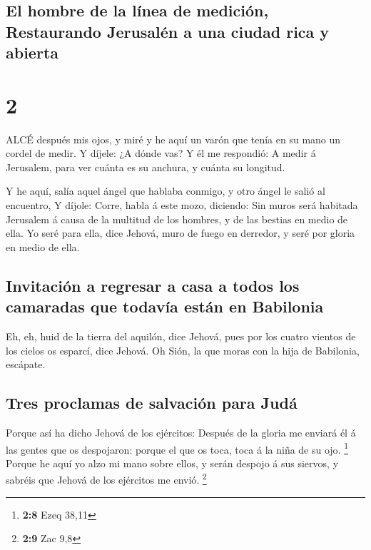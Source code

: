 \hypertarget{el-hombre-de-la-luxednea-de-mediciuxf3n-restaurando-jerusaluxe9n-a-una-ciudad-rica-y-abierta}{%
\subsection{El hombre de la línea de medición, Restaurando Jerusalén a
una ciudad rica y
abierta}\label{el-hombre-de-la-luxednea-de-mediciuxf3n-restaurando-jerusaluxe9n-a-una-ciudad-rica-y-abierta}}

\hypertarget{section-1}{%
\section{2}\label{section-1}}

 ALCÉ después mis ojos, y miré y he aquí un varón que tenía
en su mano un cordel de medir.  Y díjele: ¿A dónde vas? Y él
me respondió: A medir á Jerusalem, para ver cuánta es su anchura, y
cuánta su longitud.

 Y he aquí, salía aquel ángel que hablaba conmigo, y otro
ángel le salió al encuentro,  Y díjole: Corre, habla á este
mozo, diciendo: Sin muros será habitada Jerusalem á causa de la multitud
de los hombres, y de las bestias en medio de ella.  Yo seré
para ella, dice Jehová, muro de fuego en derredor, y seré por gloria en
medio de ella.

\hypertarget{invitaciuxf3n-a-regresar-a-casa-a-todos-los-camaradas-que-todavuxeda-estuxe1n-en-babilonia}{%
\subsection{Invitación a regresar a casa a todos los camaradas que
todavía están en
Babilonia}\label{invitaciuxf3n-a-regresar-a-casa-a-todos-los-camaradas-que-todavuxeda-estuxe1n-en-babilonia}}

 Eh, eh, huid de la tierra del aquilón, dice Jehová, pues
por los cuatro vientos de los cielos os esparcí, dice Jehová.
 Oh Sión, la que moras con la hija de Babilonia, escápate.

\hypertarget{tres-proclamas-de-salvaciuxf3n-para-juduxe1}{%
\subsection{Tres proclamas de salvación para
Judá}\label{tres-proclamas-de-salvaciuxf3n-para-juduxe1}}

 Porque así ha dicho Jehová de los ejércitos: Después de la
gloria me enviará él á las gentes que os despojaron: porque el que os
toca, toca á la niña de su ojo. \footnote{\textbf{2:8} Ezeq 38,11}
 Porque he aquí yo alzo mi mano sobre ellos, y serán despojo
á sus siervos, y sabréis que Jehová de los ejércitos me envió.
\footnote{\textbf{2:9} Zac 9,8}

